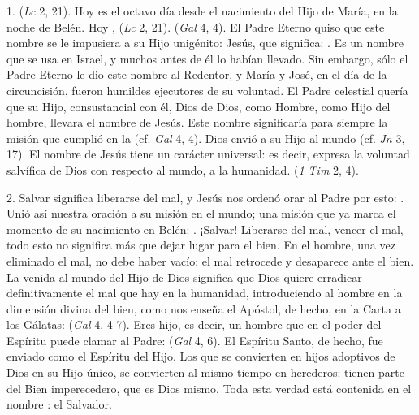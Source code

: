 \begin{body}
	1.  (\emph{Lc} 2, 21). Hoy es el octavo día desde el nacimiento del Hijo de María, en la noche de Belén. Hoy ,  (\emph{Lc} 2, 21).  (\emph{Gal} 4, 4). El Padre Eterno quiso que este nombre se le impusiera a su Hijo unigénito: Jesús, que significa: . Es un nombre que se usa en Israel, y muchos antes de él lo habían llevado. Sin embargo, sólo el Padre Eterno le dio este nombre al Redentor, y María y José, en el día de la circuncisión, fueron humildes ejecutores de su voluntad. El Padre celestial quería que su Hijo, consustancial con él, Dios de Dios, como Hombre, como Hijo del hombre, llevara el nombre de Jesús. Este nombre significaría para siempre la misión que cumplió en la  (cf. \emph{Gal} 4, 4). Dios envió a su Hijo al mundo  (cf. \emph{Jn} 3, 17). El nombre de Jesús tiene un carácter universal: es decir, expresa la voluntad salvífica de Dios con respecto al mundo, a la humanidad.  (\emph{1 Tim} 2, 4).

	2. Salvar significa liberarse del mal, y Jesús nos ordenó orar al Padre por esto: . Unió así nuestra oración a su misión en el mundo; una misión que ya marca el momento de su nacimiento en Belén: . ¡Salvar! Liberarse del mal, vencer el mal, todo esto no significa más que dejar lugar para el bien. En el hombre, una vez eliminado el mal, no debe haber vacío: el mal retrocede y desaparece ante el bien. La venida al mundo del Hijo de Dios significa que Dios quiere erradicar definitivamente el mal que hay en la humanidad, introduciendo al hombre en la dimensión divina del bien, como nos enseña el Apóstol, de hecho, en la Carta a los Gálatas:  (\emph{Gal} 4, 4-7). Eres hijo, es decir, un hombre que en el poder del Espíritu puede clamar al Padre:  (\emph{Gal} 4, 6). El Espíritu Santo, de hecho, fue enviado como el Espíritu del Hijo. Los que se convierten en hijos adoptivos de Dios en su Hijo único, se convierten al mismo tiempo en herederos: tienen parte del Bien imperecedero, que es Dios mismo. Toda esta verdad está contenida en el nombre : el Salvador.


\end{body}
